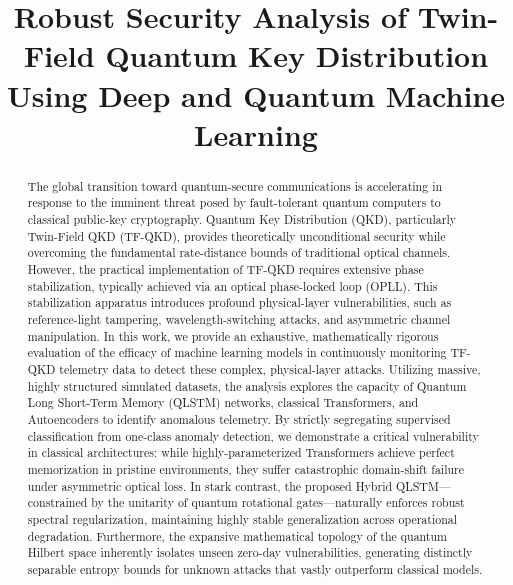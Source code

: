 \documentclass[10pt, journal, letterpaper, twocolumn]{IEEEtran}
\begin{document}
\title{Robust Security Analysis of Twin-Field Quantum Key Distribution Using Deep and Quantum Machine Learning}

\author{
}

\maketitle

\begin{abstract}
The global transition toward quantum-secure communications is accelerating in response to the imminent threat posed by fault-tolerant quantum computers to classical public-key cryptography. Quantum Key Distribution (QKD), particularly Twin-Field QKD (TF-QKD), provides theoretically unconditional security while overcoming the fundamental rate-distance bounds of traditional optical channels. However, the practical implementation of TF-QKD requires extensive phase stabilization, typically achieved via an optical phase-locked loop (OPLL). This stabilization apparatus introduces profound physical-layer vulnerabilities, such as reference-light tampering, wavelength-switching attacks, and asymmetric channel manipulation. In this work, we provide an exhaustive, mathematically rigorous evaluation of the efficacy of machine learning models in continuously monitoring TF-QKD telemetry data to detect these complex, physical-layer attacks. Utilizing massive, highly structured simulated datasets, the analysis explores the capacity of Quantum Long Short-Term Memory (QLSTM) networks, classical Transformers, and Autoencoders to identify anomalous telemetry. By strictly segregating supervised classification from one-class anomaly detection, we demonstrate a critical vulnerability in classical architectures: while highly-parameterized Transformers achieve perfect memorization in pristine environments, they suffer catastrophic domain-shift failure under asymmetric optical loss. In stark contrast, the proposed Hybrid QLSTM—constrained by the unitarity of quantum rotational gates—naturally enforces robust spectral regularization, maintaining highly stable generalization across operational degradation. Furthermore, the expansive mathematical topology of the quantum Hilbert space inherently isolates unseen zero-day vulnerabilities, generating distinctly separable entropy bounds for unknown attacks that vastly outperform classical models.
\end{abstract}
\end{document}
